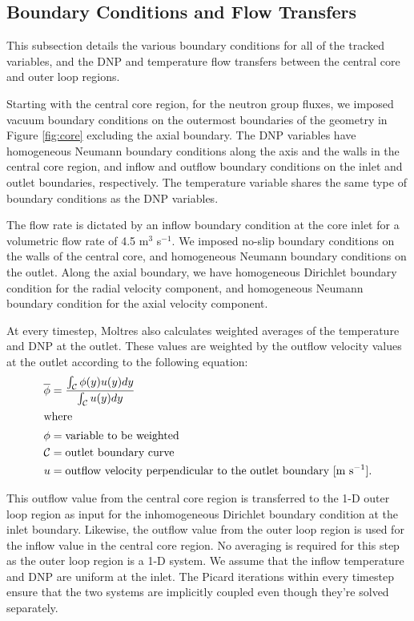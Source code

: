 \subsection{Boundary Conditions and Flow Transfers}

This subsection details the various boundary conditions for all of the
tracked variables, and the \gls{DNP} and temperature flow transfers between
the central core and outer loop regions. 

Starting with the central core region, for the neutron group fluxes, we
imposed vacuum boundary conditions on the
outermost boundaries of the geometry in Figure \ref{fig:core} excluding the
axial boundary. The \gls{DNP} variables have homogeneous Neumann boundary
conditions along the axis and the walls in the central core region, and inflow
and outflow boundary conditions on the inlet and outlet boundaries,
respectively. The temperature variable shares the same type of boundary
conditions as the \gls{DNP} variables.

The flow rate is dictated by an inflow boundary condition at the core inlet
for a volumetric flow rate of 4.5 m$^3$ s$^{-1}$. We imposed no-slip boundary
conditions on the walls of the central core, and homogeneous Neumann boundary
conditions on the outlet. Along the axial boundary, we have homogeneous
Dirichlet boundary condition for the radial velocity component, and
homogeneous Neumann boundary condition for the axial velocity component.

At every timestep, Moltres also calculates weighted averages of the
temperature and \gls{DNP} at the outlet. These values are weighted by the
outflow velocity values at the outlet according to the following equation:
%
\begin{align}
    \overline{\phi} &= \frac{\int_\mathcal{C} \phi(y) u(y) dy}{
    \int_\mathcal{C} u(y) dy} \\
    \intertext{where}
    \phi &= \text{variable to be weighted} \nonumber \\
    \mathcal{C} &= \text{outlet boundary curve} \nonumber \\
    u &= \text{outflow velocity perpendicular to the outlet boundary [m
    s$^{-1}$].} \nonumber
\end{align}

This outflow value from the central core region is transferred to the 1-D
outer loop region as input for the inhomogeneous Dirichlet boundary
condition at the inlet boundary. Likewise, the outflow value from the outer
loop region is used for the inflow value in the central core region. No
averaging is required for this step as the outer loop region is a 1-D system.
We assume that the inflow temperature and \gls{DNP} are uniform at the inlet.
The Picard iterations within every timestep ensure that the two systems are
implicitly coupled even though they're solved separately.
